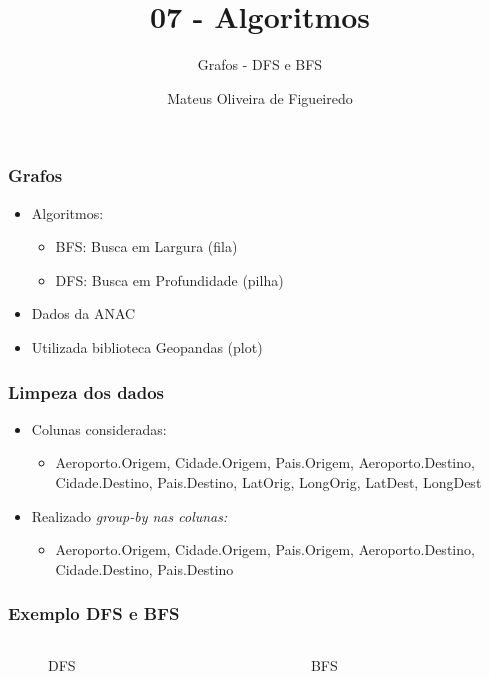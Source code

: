 \documentclass[aspectratio=169,usenames,dvipsnames]{beamer}
\title{07 - Algoritmos}
\subtitle{Grafos - DFS e BFS}
\author{Mateus Oliveira de Figueiredo}
\date{}
\begin{document}
\begin{frame}
\titlepage
\end{frame}

\begin{frame}
\frametitle{Grafos}
\vfill
\begin{itemize}
  \item  Algoritmos:
  \begin{itemize}
    \item BFS: Busca em Largura (fila)
    \item DFS: Busca em Profundidade (pilha)
  \end{itemize}
  \item Dados da ANAC 
  \item Utilizada biblioteca Geopandas (plot)
\end{itemize}
\vfill
\end{frame}

\begin{frame}
\frametitle{Limpeza dos dados}
\vfill
\begin{itemize}
  \item Colunas consideradas:
  \begin{itemize}
    \item Aeroporto.Origem, Cidade.Origem, Pais.Origem, Aeroporto.Destino, Cidade.Destino, Pais.Destino, LatOrig, LongOrig, LatDest, LongDest
  \end{itemize}

  \item Realizado \it{group-by} nas colunas:
  \begin{itemize}
    \item Aeroporto.Origem, Cidade.Origem, Pais.Origem, Aeroporto.Destino, Cidade.Destino, Pais.Destino
  \end{itemize}
\end{itemize}
\vfill
\end{frame}


\begin{frame}
\frametitle{Exemplo DFS e BFS}

  \begin{columns}
    \begin{column}{0.5\textwidth}
      \begin{figure}
        
        \caption{DFS}
      \end{figure}

    \end{column}
    \begin{column}{0.5\textwidth}
      \begin{figure}
      
      \caption{BFS}
      \end{figure}
    \end{column}
  \end{columns}

\end{frame}
\end{document}
